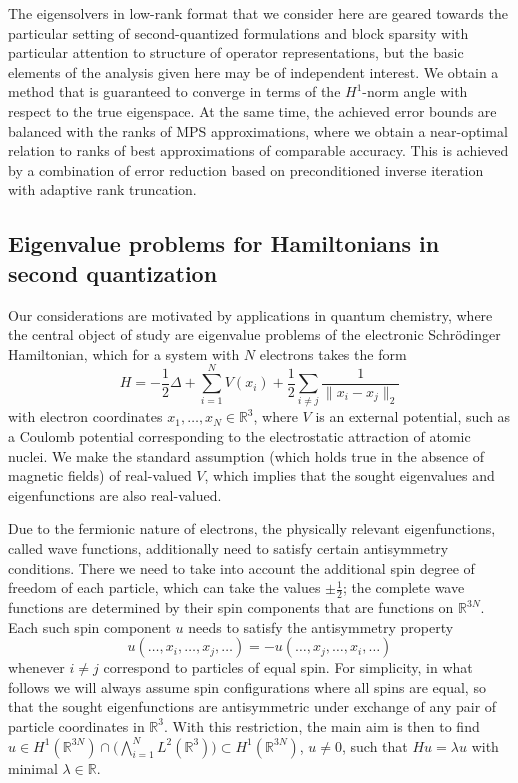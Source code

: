 \documentclass[a4paper,11pt,oneside]{amsart}
\providecommand{\norm}[1]{\lVert#1\rVert}
\theoremstyle{definition}
\theoremstyle{remark}
\newcommand{\R}{\mathbb{R}}
\numberwithin{equation}{section}
\numberwithin{theorem}{section}
\begin{document}
The eigensolvers in low-rank format that we consider here are geared towards the particular setting of second-quantized formulations and block sparsity with particular attention to structure of operator representations, but the basic elements of the analysis given here may be of independent interest.
We obtain a method that is guaranteed to converge in terms of the $H^1$-norm angle with respect to the true eigenspace. At the same time, the achieved error bounds are balanced with the ranks of MPS approximations, where we obtain a near-optimal relation to ranks of best approximations of comparable accuracy.
This is achieved by a combination of error reduction based on preconditioned inverse iteration with adaptive rank truncation.

\subsection{Eigenvalue problems for Hamiltonians in second quantization}

Our considerations are motivated by applications in quantum chemistry, where the central object of study are eigenvalue problems of the electronic Schr\"odinger Hamiltonian, which for a system with $N$ electrons takes the form
\begin{equation}\label{eq:hamilt}
   H = - \frac12 \Delta + \sum_{i=1}^N V(x_i) + \frac12 \sum_{i \neq j} \frac{1}{\norm{x_i - x_j}_2}
\end{equation}
with electron coordinates $x_1, \ldots, x_N \in \R^3$,
where $V$ is an external potential, such as a Coulomb potential corresponding to the electrostatic attraction of atomic nuclei.
We make the standard assumption (which holds true in the absence of magnetic fields) of real-valued $V$, which implies that the sought eigenvalues and eigenfunctions are also real-valued.

Due to the fermionic nature of electrons, the physically relevant eigenfunctions, called wave functions, additionally need to satisfy certain antisymmetry conditions. There we need to take into account the additional spin degree of freedom of each particle, which can take the values $\pm \frac12$; the complete wave functions are determined by their spin components that are functions on $\R^{3N}$. Each such spin component $u$ needs to satisfy the antisymmetry property
\[
   u(\ldots, x_i , \ldots, x_j, \ldots) = - u(\ldots, x_j, \ldots, x_i, \ldots)
\]
whenever $i \neq j$ correspond to particles of equal spin.
For simplicity, in what follows we will always assume spin configurations where all spins are equal, so that the sought eigenfunctions are antisymmetric under exchange of any pair of particle coordinates in $\R^3$.
With this restriction, the main aim is then to find $u \in H^1(\R^{3N}) \cap \bigl(\bigwedge_{i=1}^N L^2(\R^3)\bigr) \subset H^1(\R^{3N})$, $u \neq 0$, such that $H u = \lambda u$ with minimal $\lambda \in \R$.
\end{document}

